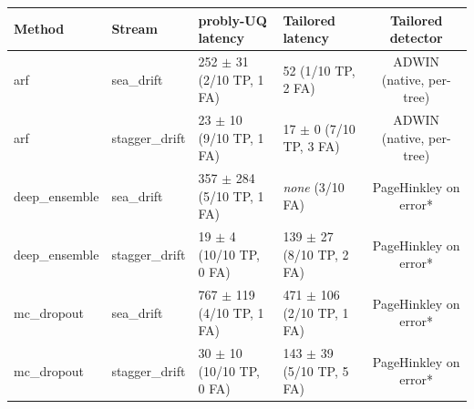 \begin{tabular}{llllc}
    \toprule
    Method & Stream & probly-UQ latency & Tailored latency & Tailored detector \\
    \midrule
        arf & sea_drift & 252 $\pm$ 31 (2/10 TP, 1 FA) & 52 (1/10 TP, 2 FA) & ADWIN (native, per-tree) \\
        arf & stagger_drift & 23 $\pm$ 10 (9/10 TP, 1 FA) & 17 $\pm$ 0 (7/10 TP, 3 FA) & ADWIN (native, per-tree) \\
        deep_ensemble & sea_drift & 357 $\pm$ 284 (5/10 TP, 1 FA) & \textit{none} (3/10 FA) & PageHinkley on error* \\
        deep_ensemble & stagger_drift & 19 $\pm$ 4 (10/10 TP, 0 FA) & 139 $\pm$ 27 (8/10 TP, 2 FA) & PageHinkley on error* \\
        mc_dropout & sea_drift & 767 $\pm$ 119 (4/10 TP, 1 FA) & 471 $\pm$ 106 (2/10 TP, 1 FA) & PageHinkley on error* \\
        mc_dropout & stagger_drift & 30 $\pm$ 10 (10/10 TP, 0 FA) & 143 $\pm$ 39 (5/10 TP, 5 FA) & PageHinkley on error* \\
    \bottomrule
\end{tabular}
